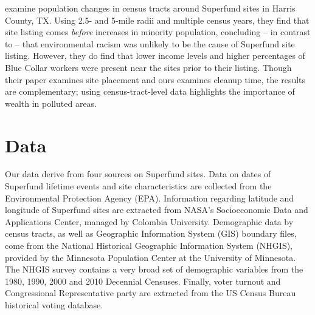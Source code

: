 \documentclass[12pt]{article}
\begin{document}

\textcite{Aydin2006} examine population changes in census tracts around Superfund sites in Harris County, TX. Using 2.5- and 5-mile radii and multiple census years, they find that site listing comes {\it before} increases in minority population, concluding -- in contrast to \textcite{burda2014environmental} -- that environmental racism was unlikely to be the cause of Superfund site listing. However, they do find that lower income levels and higher percentages of Blue Collar workers were present near the sites prior to their listing. Though their paper examines site placement and ours examines cleanup time, the results are complementary; using census-tract-level data highlights the importance of wealth in polluted areas. 

\section{Data}\label{data}


Our data derive from four sources on Superfund sites. Data on dates of Superfund lifetime events and site characteristics are collected from the Environmental Protection Agency (EPA). Information regarding latitude and longitude of Superfund sites are extracted from NASA's Socioeconomic Data and Applications Center, managed by Colombia University. Demographic data by census tracts, as well as Geographic Information System (GIS) boundary files, come from the National Historical Geographic Information System (NHGIS), provided by the Minnesota Population Center at the University of Minnesota. The NHGIS survey contains a very broad set of demographic variables from the 1980, 1990, 2000 and 2010 Decennial Censuses. Finally, voter turnout and Congressional Representative party are extracted from the US Census Bureau historical voting database. 
\end{document}
